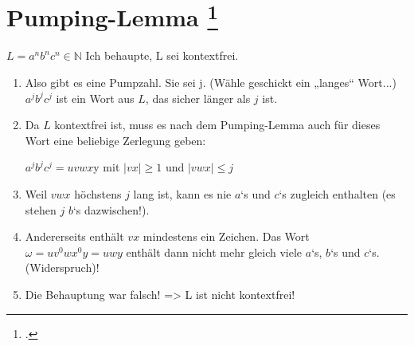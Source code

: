 \documentclass{lehramt-informatik-aufgabe}
\begin{document}
\section{Pumping-Lemma
\footcite[Seite 42]{theo:fs:2}}

$L = a^n b^n c^n \in \mathbb{N}$
Ich behaupte, L sei kontextfrei.

\begin{enumerate}
\item Also gibt es eine Pumpzahl. Sie sei j.
(Wähle geschickt ein „langes“ Wort...)
$a^j b^j c^j$ ist ein Wort aus $L$, das sicher länger als $j$ ist.

\item  Da $L$ kontextfrei ist, muss es nach dem Pumping-Lemma auch für dieses Wort
eine beliebige Zerlegung geben:

$a^j b^j c^j = uvwx$y mit $|vx| \geq 1$ und $|vwx| \leq j$

\item  Weil $vwx$ höchstens $j$ lang ist, kann es nie $a$‘s und $c$‘s zugleich enthalten (es
stehen $j$ $b$‘s dazwischen!).

\item Andererseits enthält $vx$ mindestens ein Zeichen. Das Wort $\omega =
uv^0 wx^0 y = uwy$ enthält dann nicht mehr gleich viele $a$‘s, $b$‘s und
$c$‘s. (Widerspruch)!

\item Die Behauptung war falsch! => L ist nicht kontextfrei!

\end{enumerate}
\end{document}
